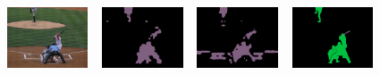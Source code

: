 

\begin{figure}[p!]
  \centering
  \hspace{4em}
  \hspace{1.5em}
  \hspace{1.5em}
  \vspace{-0.05em} %
  \vspace{-0.05em}
  

  {\includegraphics[width=0.24\textwidth, height=1.8cm]{figures/experiments/coco/image/0024.jpg}}
  {\includegraphics[width=0.24\textwidth, height=1.8cm]{figures/experiments/coco/orgckpt/0024.png}}
  {\includegraphics[width=0.24\textwidth, height=1.8cm]{figures/experiments/coco/nonnoisy/0024.png}}
  {\includegraphics[width=0.24\textwidth, height=1.8cm]{figures/experiments/coco/gt/000000002153_instanceTrainIds.png}}
  

\end{figure}
